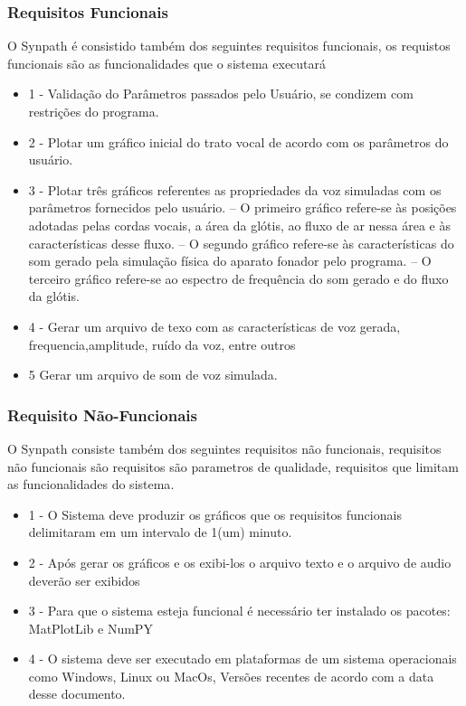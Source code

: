 	
		\subsubsection{Requisitos Funcionais}
		
		O Synpath é consistido também dos seguintes requisitos funcionais, os requistos funcionais são as funcionalidades que o sistema executará\cite{SWEBOK}
		
		\begin{itemize}
			\item 1 - Validação do Parâmetros passados pelo Usuário, se condizem com restrições do programa.
			\item 2 - Plotar um gráﬁco inicial do trato vocal de acordo com os parâmetros do usuário.
			\item 3 - Plotar três gráﬁcos referentes as propriedades da voz simuladas com os parâmetros fornecidos pelo usuário. – O primeiro gráﬁco refere-se às posições adotadas pelas cordas vocais, a área da glótis, ao ﬂuxo de ar nessa área e às características desse ﬂuxo. – O segundo gráﬁco refere-se às características do som gerado pela simulação física do aparato fonador pelo programa. – O terceiro gráﬁco refere-se ao espectro de frequência do som gerado e do ﬂuxo da glótis.
			\item 4 - Gerar um arquivo de texo com as características de voz gerada, frequencia,amplitude, ruído da voz, entre outros
			\item 5 Gerar um arquivo de som de voz simulada.
		\end{itemize}
		
		\subsubsection{Requisito Não-Funcionais}
		
		O Synpath consiste também dos seguintes requisitos não funcionais, requisitos não funcionais são requisitos são parametros de qualidade, requisitos que limitam as funcionalidades do sistema\cite{SWEBOK}.
		
		\begin{itemize}
			\item 1 - O Sistema deve produzir os gráficos que os requisitos funcionais delimitaram em um intervalo de 1(um) minuto. 
			\item 2  - Após gerar os gráficos e os exibi-los o arquivo texto e o arquivo de audio deverão ser exibidos
			\item 3 - Para que o sistema esteja funcional é necessário ter instalado os pacotes: MatPlotLib e NumPY
			\item 4 - O sistema deve ser executado em plataformas de um sistema operacionais como Windows, Linux ou MacOs, Versões recentes de acordo com a data desse documento. 
			
		\end{itemize}
		
